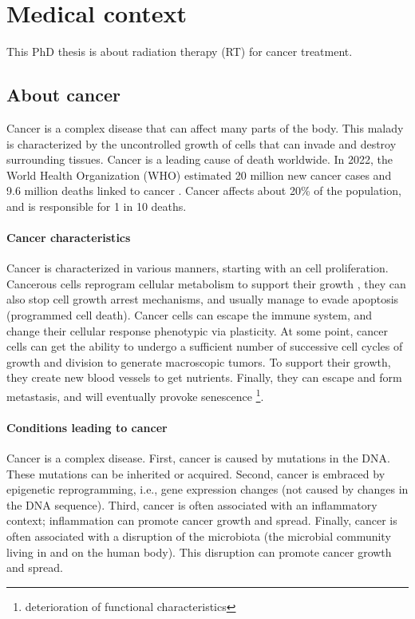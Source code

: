 \section{Medical context}
This PhD thesis is about radiation therapy (RT) for cancer treatment.

\subsection{About cancer}
Cancer is a complex disease that can affect many parts of the body.
This malady is characterized by the uncontrolled growth of cells that can invade and destroy surrounding tissues.
Cancer is a leading cause of death worldwide.
In 2022, the World Health Organization (WHO) estimated 20 million new cancer cases and 9.6 million deaths linked to cancer \cite{who_cancer2022}.
Cancer affects about 20\% of the population, and is responsible for 1 in 10 deaths.

\paragraph{Cancer characteristics}
Cancer is characterized in various manners, starting with an cell proliferation.
Cancerous cells reprogram cellular metabolism to support their growth \cite{Chammas2013}, they can also stop cell growth arrest mechanisms, and usually manage to evade apoptosis (programmed cell death).
Cancer cells can escape the immune system, and change their cellular response phenotypic via plasticity.
At some point, cancer cells can get the ability to undergo a sufficient number of successive cell cycles of growth and division to generate macroscopic tumors.
To support their growth, they create new blood vessels to get nutrients.
Finally, they can escape and form metastasis, and will eventually provoke senescence \footnote{deterioration of functional characteristics}.

\paragraph{Conditions leading to cancer}
Cancer is a complex disease.
First, cancer is caused by mutations in the DNA.
These mutations can be inherited or acquired.
Second, cancer is embraced by epigenetic reprogramming, i.e., gene expression changes (not caused by changes in the DNA sequence).
Third, cancer is often associated with an inflammatory context; inflammation can promote cancer growth and spread.
Finally, cancer is often associated with a disruption of the microbiota (the microbial community living in and on the human body).
This disruption can promote cancer growth and spread.

